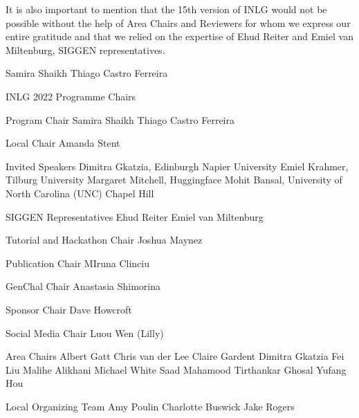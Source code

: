 It is also important to mention that the 15th version of INLG would not be possible without the help of Area Chairs and Reviewers for whom we express our entire gratitude and that we relied on the expertise of Ehud Reiter and Emiel van Miltenburg, SIGGEN representatives.

Samira Shaikh
Thiago Castro Ferreira

INLG 2022 Programme Chairs

Program Chair
Samira Shaikh
Thiago Castro Ferreira

Local Chair
Amanda Stent

Invited Speakers
Dimitra Gkatzia, Edinburgh Napier University
Emiel Krahmer, Tilburg University
Margaret Mitchell, Huggingface
Mohit Bansal, University of North Carolina (UNC) Chapel Hill

SIGGEN Representatives
Ehud Reiter
Emiel van Miltenburg

Tutorial and Hackathon Chair
Joshua Maynez

Publication Chair
MIruna Clinciu

GenChal Chair
Anastasia Shimorina

Sponsor Chair
Dave Howcroft

Social Media Chair
Luou Wen (Lilly)

Area Chairs
Albert Gatt
Chris van der Lee
Claire Gardent
Dimitra Gkatzia
Fei Liu
Malihe Alikhani
Michael White
Saad Mahamood
Tirthankar Ghosal
Yufang Hou

Local Organizing Team
Amy Poulin
Charlotte Buswick
Jake Rogers
